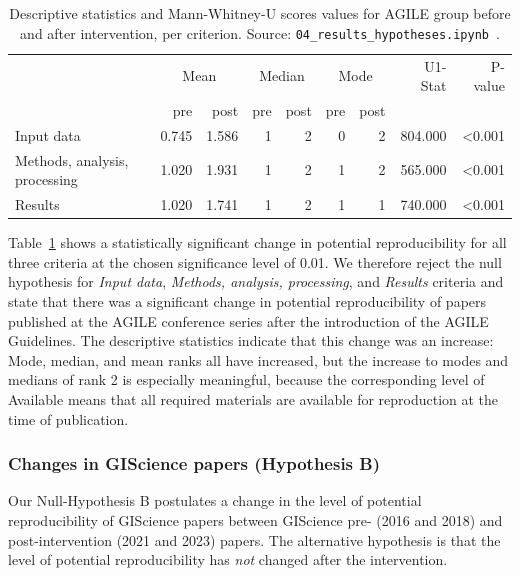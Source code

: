 \documentclass{josis}
\begin{document}
\begin{table}
\begin{tabular}{lrrrrrrrr}
\toprule
 & \multicolumn{2}{c}{Mean} & \multicolumn{2}{c}{Median} & \multicolumn{2}{c}{Mode} & U1-Stat & P-value \\
 & pre & post & pre & post & pre & post &  &  \\
\midrule
Input data & 0.745 & 1.586 & 1 & 2 & 0 & 2 & 804.000 & <0.001 \\
Methods, analysis, processing & 1.020 & 1.931 & 1 & 2 & 1 & 2 & 565.000 & <0.001 \\
Results & 1.020 & 1.741 & 1 & 2 & 1 & 1 & 740.000 & <0.001 \\
\bottomrule
\end{tabular}
\caption{Descriptive statistics and Mann-Whitney-U scores values for AGILE group before and after intervention, per criterion. Source: \texttt{04\_results\_hypotheses.ipynb}~\cite{data}.}
\label{tab:mannwhitney_agile}
\end{table}

Table~\ref{tab:mannwhitney_agile} shows a statistically significant change in potential reproducibility for all three criteria at the chosen significance level of 0.01.
We therefore reject the null hypothesis for \textit{Input data}, \textit{Methods, analysis, processing}, and \textit{Results} criteria and state that there was a significant change in potential reproducibility of papers published at the AGILE conference series after the introduction of the AGILE Guidelines. 
The descriptive statistics indicate that this change was an increase: Mode, median, and mean ranks all have increased, but the increase to modes and medians of rank 2 is especially meaningful, because the corresponding level of Available means that all required materials are available for reproduction at the time of publication. 

\subsubsection{Changes in GIScience papers (Hypothesis B)}

Our Null-Hypothesis B postulates a change in the level of potential reproducibility of GIScience papers between GIScience pre- (2016 and 2018) and post-intervention (2021 and 2023) papers. 
The alternative hypothesis is that the level of potential reproducibility has \emph{not} changed after the intervention.
\end{document}
